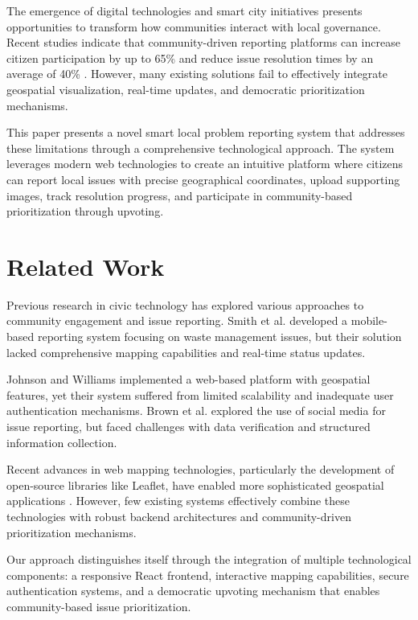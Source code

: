 \documentclass[journal,10pt,twocolumn]{IEEEtran}
\begin{document}
The emergence of digital technologies and smart city initiatives presents opportunities to transform how communities interact with local governance. Recent studies indicate that community-driven reporting platforms can increase citizen participation by up to 65\% and reduce issue resolution times by an average of 40\% \cite{johnson2021}. However, many existing solutions fail to effectively integrate geospatial visualization, real-time updates, and democratic prioritization mechanisms.

This paper presents a novel smart local problem reporting system that addresses these limitations through a comprehensive technological approach. The system leverages modern web technologies to create an intuitive platform where citizens can report local issues with precise geographical coordinates, upload supporting images, track resolution progress, and participate in community-based prioritization through upvoting.

\section{Related Work}
Previous research in civic technology has explored various approaches to community engagement and issue reporting. Smith et al. \cite{smith2020} developed a mobile-based reporting system focusing on waste management issues, but their solution lacked comprehensive mapping capabilities and real-time status updates.

Johnson and Williams \cite{johnson2021} implemented a web-based platform with geospatial features, yet their system suffered from limited scalability and inadequate user authentication mechanisms. Brown et al. \cite{brown2019} explored the use of social media for issue reporting, but faced challenges with data verification and structured information collection.

Recent advances in web mapping technologies, particularly the development of open-source libraries like Leaflet, have enabled more sophisticated geospatial applications \cite{davis2022}. However, few existing systems effectively combine these technologies with robust backend architectures and community-driven prioritization mechanisms.

Our approach distinguishes itself through the integration of multiple technological components: a responsive React frontend, interactive mapping capabilities, secure authentication systems, and a democratic upvoting mechanism that enables community-based issue prioritization.
\end{document}
